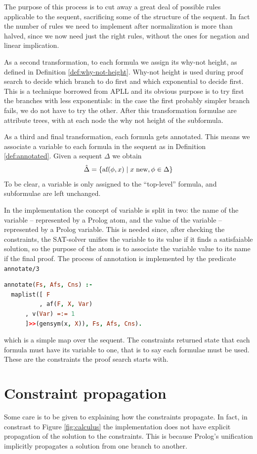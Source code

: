 \documentclass[a4paper, 12pt, tesi, english]{report}
\begin{document}
The purpose of this process is to cut away a great deal of possible rules applicable to the sequent, sacrificing some of the structure of the sequent.
In fact the number of rules we need to implement after normalization is more than halved, since we now need just the right rules, without the ones for negation and linear implication.

As a second transformation, to each formula we assign its why-not height, as defined in Definition \ref{def:why-not-height}.
Why-not height is used during proof search to decide which branch to do first and which exponential to decide first.
This is a technique borrowed from APLL and its obvious purpose is to try first the branches with less exponentials: in the case the first probably simpler branch fails, we do not have to try the other.
After this transformation formulae are attribute trees, with at each node the why not height of the subformula.

As a third and final transformation, each formula gets annotated.
This means we associate a variable to each formula in the sequent as in Definition \ref{def:annotated}.
Given a sequent $\Delta$ we obtain
$$ \hat{\Delta} = \{ \text{af}(\phi, x) \mid x \; \text{new}, \phi \in \Delta \} $$
To be clear, a variable is only assigned to the ``top-level'' formula, and subformulae are left unchanged.

In the implementation the concept of variable is split in two: the name of the variable -- represented by a Prolog atom, and the value of the variable -- represented by a Prolog variable.
This is needed since, after checking the constraints, the SAT-solver unifies the variable to its value if it finds a satisfaiable solution, so the purpose of the atom is to associate the variable value to its name if the final proof.
The process of annotation is implemented by the predicate \texttt{annotate/3}
\begin{lstlisting}[language=prolog]
%! annotate(+[Formulae], -[AFs], -[Constraints]) is det.
annotate(Fs, Afs, Cns) :-
  maplist([ F
          , af(F, X, Var)
	  , v(Var) =:= 1
	  ]>>(gensym(x, X)), Fs, Afs, Cns).
\end{lstlisting}
which is a simple map over the sequent.
The constraints returned state that each formula must have its variable to one, that is to say each formulae must be used.
These are the constraints the proof search starts with.

\section{Constraint propagation}
Some care is to be given to explaining how the constraints propagate.
In fact, in constrast to Figure \ref{fig:calculus} the implementation does not have explicit propagation of the solution to the constraints.
This is because Prolog's unification implicitly propagates a solution from one branch to another.
\end{document}

